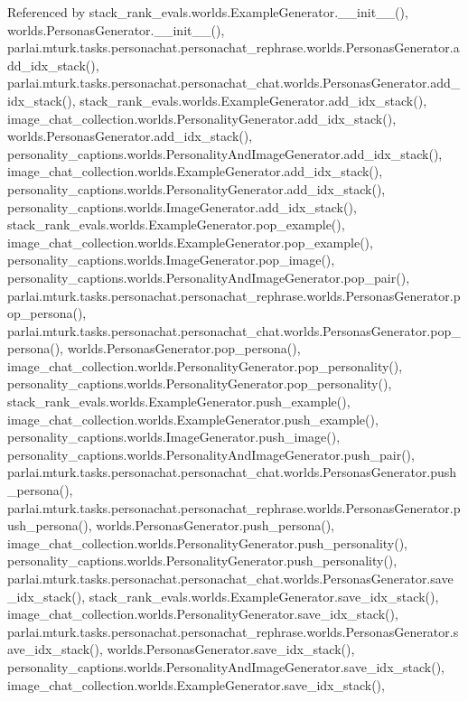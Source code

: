 Referenced by stack\+\_\+rank\+\_\+evals.\+worlds.\+Example\+Generator.\+\_\+\+\_\+init\+\_\+\+\_\+(), worlds.\+Personas\+Generator.\+\_\+\+\_\+init\+\_\+\+\_\+(), parlai.\+mturk.\+tasks.\+personachat.\+personachat\+\_\+rephrase.\+worlds.\+Personas\+Generator.\+add\+\_\+idx\+\_\+stack(), parlai.\+mturk.\+tasks.\+personachat.\+personachat\+\_\+chat.\+worlds.\+Personas\+Generator.\+add\+\_\+idx\+\_\+stack(), stack\+\_\+rank\+\_\+evals.\+worlds.\+Example\+Generator.\+add\+\_\+idx\+\_\+stack(), image\+\_\+chat\+\_\+collection.\+worlds.\+Personality\+Generator.\+add\+\_\+idx\+\_\+stack(), worlds.\+Personas\+Generator.\+add\+\_\+idx\+\_\+stack(), personality\+\_\+captions.\+worlds.\+Personality\+And\+Image\+Generator.\+add\+\_\+idx\+\_\+stack(), image\+\_\+chat\+\_\+collection.\+worlds.\+Example\+Generator.\+add\+\_\+idx\+\_\+stack(), personality\+\_\+captions.\+worlds.\+Personality\+Generator.\+add\+\_\+idx\+\_\+stack(), personality\+\_\+captions.\+worlds.\+Image\+Generator.\+add\+\_\+idx\+\_\+stack(), stack\+\_\+rank\+\_\+evals.\+worlds.\+Example\+Generator.\+pop\+\_\+example(), image\+\_\+chat\+\_\+collection.\+worlds.\+Example\+Generator.\+pop\+\_\+example(), personality\+\_\+captions.\+worlds.\+Image\+Generator.\+pop\+\_\+image(), personality\+\_\+captions.\+worlds.\+Personality\+And\+Image\+Generator.\+pop\+\_\+pair(), parlai.\+mturk.\+tasks.\+personachat.\+personachat\+\_\+rephrase.\+worlds.\+Personas\+Generator.\+pop\+\_\+persona(), parlai.\+mturk.\+tasks.\+personachat.\+personachat\+\_\+chat.\+worlds.\+Personas\+Generator.\+pop\+\_\+persona(), worlds.\+Personas\+Generator.\+pop\+\_\+persona(), image\+\_\+chat\+\_\+collection.\+worlds.\+Personality\+Generator.\+pop\+\_\+personality(), personality\+\_\+captions.\+worlds.\+Personality\+Generator.\+pop\+\_\+personality(), stack\+\_\+rank\+\_\+evals.\+worlds.\+Example\+Generator.\+push\+\_\+example(), image\+\_\+chat\+\_\+collection.\+worlds.\+Example\+Generator.\+push\+\_\+example(), personality\+\_\+captions.\+worlds.\+Image\+Generator.\+push\+\_\+image(), personality\+\_\+captions.\+worlds.\+Personality\+And\+Image\+Generator.\+push\+\_\+pair(), parlai.\+mturk.\+tasks.\+personachat.\+personachat\+\_\+chat.\+worlds.\+Personas\+Generator.\+push\+\_\+persona(), parlai.\+mturk.\+tasks.\+personachat.\+personachat\+\_\+rephrase.\+worlds.\+Personas\+Generator.\+push\+\_\+persona(), worlds.\+Personas\+Generator.\+push\+\_\+persona(), image\+\_\+chat\+\_\+collection.\+worlds.\+Personality\+Generator.\+push\+\_\+personality(), personality\+\_\+captions.\+worlds.\+Personality\+Generator.\+push\+\_\+personality(), parlai.\+mturk.\+tasks.\+personachat.\+personachat\+\_\+chat.\+worlds.\+Personas\+Generator.\+save\+\_\+idx\+\_\+stack(), stack\+\_\+rank\+\_\+evals.\+worlds.\+Example\+Generator.\+save\+\_\+idx\+\_\+stack(), image\+\_\+chat\+\_\+collection.\+worlds.\+Personality\+Generator.\+save\+\_\+idx\+\_\+stack(), parlai.\+mturk.\+tasks.\+personachat.\+personachat\+\_\+rephrase.\+worlds.\+Personas\+Generator.\+save\+\_\+idx\+\_\+stack(), worlds.\+Personas\+Generator.\+save\+\_\+idx\+\_\+stack(), personality\+\_\+captions.\+worlds.\+Personality\+And\+Image\+Generator.\+save\+\_\+idx\+\_\+stack(), image\+\_\+chat\+\_\+collection.\+worlds.\+Example\+Generator.\+save\+\_\+idx\+\_\+stack(), 